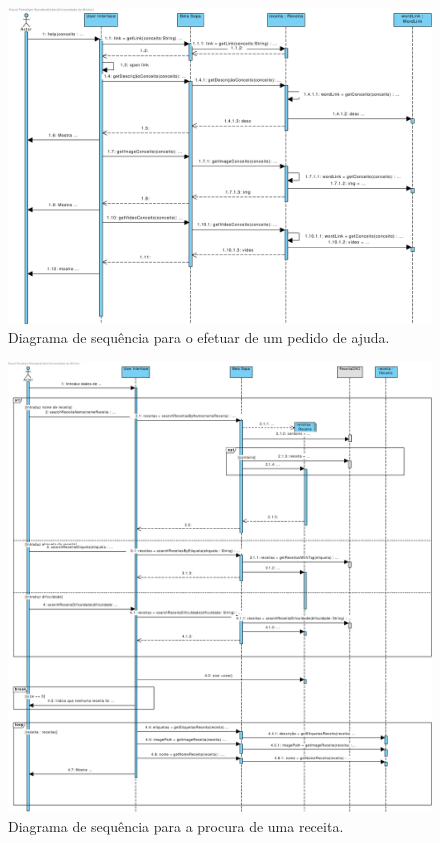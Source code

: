  \begin{figure}[ht]
   \centering
   \includegraphics[width=\textwidth]{figures/10/Pedir_ajuda.pdf}
   \caption{Diagrama de sequência para o efetuar de um pedido de ajuda.}
   \label{fig:negocio:DiagramaSequencia8}
 \end{figure}
 
 \begin{figure}[ht]
   \centering
   \includegraphics[width=\textwidth]{figures/10/Procurar_receita.pdf}
   \caption{Diagrama de sequência para a procura de uma receita.}
   \label{fig:negocio:DiagramaSequencia9}
 \end{figure}
 
